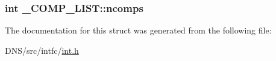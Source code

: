 \subsubsection[{\texorpdfstring{ncomps}{ncomps}}]{\setlength{\rightskip}{0pt plus 5cm}int \+\_\+\+C\+O\+M\+P\+\_\+\+L\+I\+S\+T\+::ncomps}\hypertarget{struct___c_o_m_p___l_i_s_t_a62d61d10e4eec562a3b6376467cd355d}{}\label{struct___c_o_m_p___l_i_s_t_a62d61d10e4eec562a3b6376467cd355d}


The documentation for this struct was generated from the following file\+:\begin{DoxyCompactItemize}
\item 
D\+N\+S/src/intfc/\hyperlink{int_8h}{int.\+h}\end{DoxyCompactItemize}
